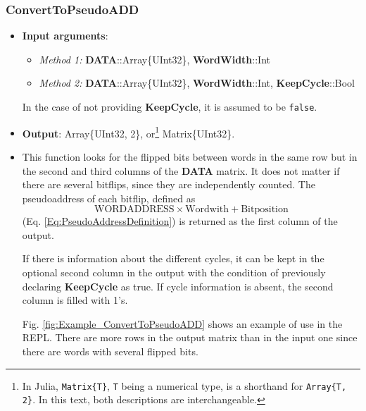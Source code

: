  \subsubsection*{ConvertToPseudoADD}\label{Func:ConvertToPseudoADD}
 \begin{itemize}
 	\item \textbf{Input arguments}: 
 	\begin{itemize}
 		\item \textit{Method 1: }\textbf{DATA}::Array\{UInt32\}, \textbf{WordWidth}::Int
 		\item \textit{Method 2: }\textbf{DATA}::Array\{UInt32\}, \textbf{WordWidth}::Int, \textbf{KeepCycle}::Bool
 	\end{itemize}
 
 	In the case of not providing \textbf{KeepCycle}, it is assumed to be \texttt{false}.
 
 	\item   \textbf{Output}: Array\{UInt32, 2\}, or\footnote{In Julia, \texttt{Matrix\{T\}}, \texttt{T} being a numerical type, is a shorthand for \texttt{Array\{T, 2\}}. In this text, both descriptions are interchangeable.}  Matrix\{UInt32\}.
 	\item  This function looks for the flipped bits between words in the same row but in the second
 	and third columns of the \textbf{DATA} matrix. It does not matter if there are several bitflips, since they are independently counted. 
 	The pseudoaddress  of each bitflip, defined as \[\text{WORDADDRESS}\times\text{Wordwith}+\text{Bitposition}\] (Eq. \ref{Eq:PseudoAddressDefinition}) is returned as the first column of the output.
 
 	If there is information about the different cycles, it can be kept in the optional second column in the output with the condition of previously declaring \textbf{KeepCycle} as true. If cycle information is absent, the second column is filled with 1's.
 	
 	Fig. \ref{fig:Example_ConvertToPseudoADD} shows an example of use in the REPL. There are more rows in the output matrix than in the input one since there are words with several flipped bits.
 	

\end{itemize}
